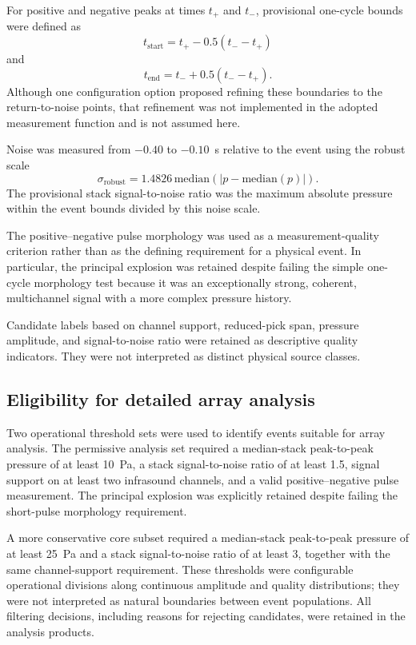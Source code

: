 \documentclass[]{seismica}
\begin{document}
For positive and negative peaks at times $t_+$ and $t_-$, provisional one-cycle bounds were defined as
\begin{equation}
  t_{\mathrm{start}} = t_+ - 0.5(t_- - t_+)
  \label{eq:pulse_start}
\end{equation}
and
\begin{equation}
  t_{\mathrm{end}} = t_- + 0.5(t_- - t_+).
  \label{eq:pulse_end}
\end{equation}
Although one configuration option proposed refining these boundaries to the return-to-noise points, that refinement was not implemented in the adopted measurement function and is not assumed here.

Noise was measured from $-0.40$ to $-0.10$~s relative to the event using the robust scale
\begin{equation}
  \sigma_{\mathrm{robust}} = 1.4826\,\mathrm{median}\left(\left|p-\mathrm{median}(p)\right|\right).
  \label{eq:robust_noise}
\end{equation}
The provisional stack signal-to-noise ratio was the maximum absolute pressure within the event bounds divided by this noise scale.

The positive--negative pulse morphology was used as a measurement-quality criterion rather than as the defining requirement for a physical event. In particular, the principal explosion was retained despite failing the simple one-cycle morphology test because it was an exceptionally strong, coherent, multichannel signal with a more complex pressure history.

Candidate labels based on channel support, reduced-pick span, pressure amplitude, and signal-to-noise ratio were retained as descriptive quality indicators. They were not interpreted as distinct physical source classes.

\subsection{Eligibility for detailed array analysis}

Two operational threshold sets were used to identify events suitable for array analysis. The permissive analysis set required a median-stack peak-to-peak pressure of at least 10~Pa, a stack signal-to-noise ratio of at least 1.5, signal support on at least two infrasound channels, and a valid positive--negative pulse measurement. The principal explosion was explicitly retained despite failing the short-pulse morphology requirement.

A more conservative core subset required a median-stack peak-to-peak pressure of at least 25~Pa and a stack signal-to-noise ratio of at least 3, together with the same channel-support requirement. These thresholds were configurable operational divisions along continuous amplitude and quality distributions; they were not interpreted as natural boundaries between event populations. All filtering decisions, including reasons for rejecting candidates, were retained in the analysis products.
\end{document}
